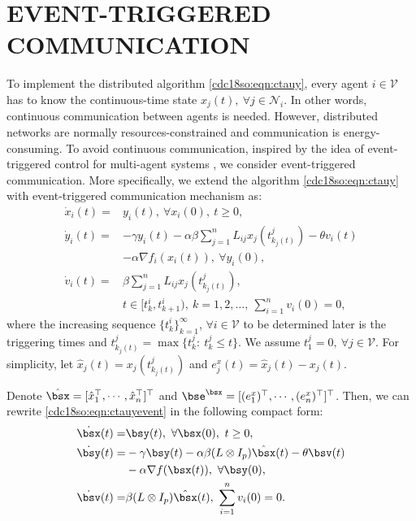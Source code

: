 \documentclass[letterpaper, 10 pt, conference]{ieeeconf}  %
\begin{document}
\section{EVENT-TRIGGERED COMMUNICATION}\label{cdc18so:sec:event}
To implement the distributed algorithm \eqref{cdc18so:eqn:ctauy}, every agent $i\in\mathcal{V}$ has to know the continuous-time state $x_j(t),~\forall j\in\mathcal{N}_i$. In other words, continuous communication between agents is needed. However, distributed networks are normally resources-constrained and communication is energy-consuming. To avoid continuous communication, inspired by the idea of event-triggered control for multi-agent systems \cite{dimarogonas2012distributed}, we consider event-triggered communication.
More specifically, we extend the algorithm \eqref{cdc18so:eqn:ctauy} with event-triggered communication mechanism as: %
\begin{subequations}\label{cdc18so:eqn:ctauyevent}
\begin{align}
    \dot{x}_i(t) =&y_i(t),~\forall x_i(0),~t\ge0,\label{cdc18so:eqn:ctauyevent2}\\
  \dot{y}_i(t) =  & - \gamma y_i(t)-\alpha\beta \sum_{j=1}^{n} L_{ij} x_j(t^j_{k_j(t)})  -\theta  v_i(t)\nonumber\\
  &- \alpha \nabla f_i(x_i(t)),~\forall y_i(0),\label{cdc18so:eqn:ctauyevent3}\\
  \dot{v}_i(t) = &\beta \sum_{j=1}^{n} L_{ij} x_j(t^j_{k_j(t)}),\nonumber\\
&t\in[t^i_k,t^i_{k+1}),~k=1,2,\dots,~\sum_{i=1}^nv_i(0)=0,\label{cdc18so:eqn:ctauyevent1}
\end{align}
\end{subequations}
where the increasing sequence  $\{t_{k}^{i}\}_{k=1}^{\infty}$, $\forall i\in\mathcal V$ to be determined later is the triggering times and $t^j_{k_j(t)}=\max\{t^{j}_{k}:~t^{j}_{k}\le t\}$. We assume $t^j_1=0, ~\forall j\in\mathcal V$. For simplicity, let $\hat{x}_j(t)=x_j(t^j_{k_j(t)})$ and $e^{x}_j(t)=\hat{x}_j(t)-x_j(t)$.

Denote $\hat{\bsx}=[\hat{x}_1^\top,\cdots,\hat{x}_n^\top]^\top$ and $\bse^{\bsx}=[(e^{x}_1)^\top,\cdots,(e^{x}_n)^\top]^\top$. Then, we can rewrite \eqref{cdc18so:eqn:ctauyevent} in the following compact form:
\begin{subequations}\label{cdc18so:eqn:ctaevent}
\begin{align}
    \dot{\bsx}(t) =&\bsy(t),~\forall \bsx(0),~t\ge0,\label{cdc18so:eqn:ctaevent2}\\
  \dot{\bsy}(t) = & - \gamma \bsy(t)-\alpha\beta (L \otimes I_p)\hat{\bsx}(t) -\theta  \bsv(t)\nonumber\\
  & - \alpha \nabla f(\bsx(t)),~\forall \bsy(0),\label{cdc18so:eqn:ctaevent3}\\
   \dot{\bsv}(t) = &\beta ( L \otimes I_p ) \hat{\bsx}(t),~\sum_{i=1}^nv_i(0)=0.\label{cdc18so:eqn:ctaevent1}
\end{align}
\end{subequations}
\end{document}
